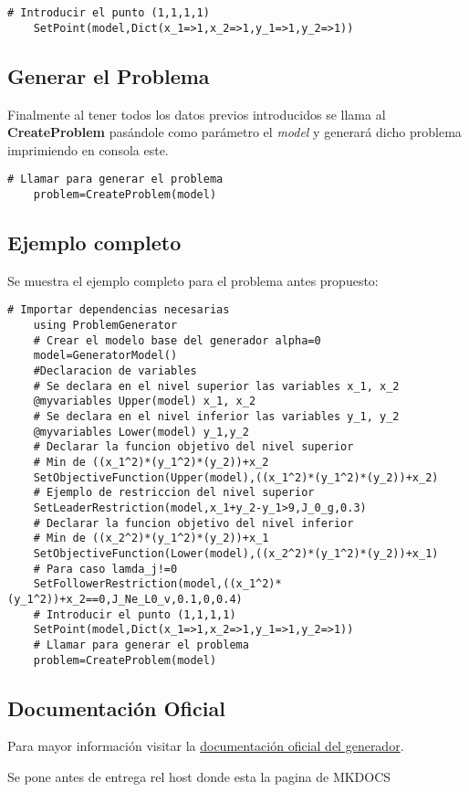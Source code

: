 \begin{lstlisting}[caption={Introducir el punto $(1,1,1,1)$}]
    # Introducir el punto (1,1,1,1)
    SetPoint(model,Dict(x_1=>1,x_2=>1,y_1=>1,y_2=>1))
\end{lstlisting}

\subsection{Generar el Problema}
Finalmente al tener todos los datos previos introducidos se llama al \textbf{CreateProblem} pasándole como parámetro el \textit{model} 
y generará dicho problema imprimiendo en consola este.

\begin{lstlisting}[caption={Generar el problema}]
    # Llamar para generar el problema
    problem=CreateProblem(model)
\end{lstlisting}
\begin{samepage}
    
\subsection{Ejemplo completo}
Se muestra el ejemplo completo para el problema antes propuesto:
\begin{lstlisting}[caption={Script}]
    # Importar dependencias necesarias
    using ProblemGenerator
    # Crear el modelo base del generador alpha=0
    model=GeneratorModel()
    #Declaracion de variables
    # Se declara en el nivel superior las variables x_1, x_2
    @myvariables Upper(model) x_1, x_2
    # Se declara en el nivel inferior las variables y_1, y_2
    @myvariables Lower(model) y_1,y_2
    # Declarar la funcion objetivo del nivel superior
    # Min de ((x_1^2)*(y_1^2)*(y_2))+x_2
    SetObjectiveFunction(Upper(model),((x_1^2)*(y_1^2)*(y_2))+x_2)
    # Ejemplo de restriccion del nivel superior
    SetLeaderRestriction(model,x_1+y_2-y_1>9,J_0_g,0.3)
    # Declarar la funcion objetivo del nivel inferior
    # Min de ((x_2^2)*(y_1^2)*(y_2))+x_1
    SetObjectiveFunction(Lower(model),((x_2^2)*(y_1^2)*(y_2))+x_1)
    # Para caso lamda_j!=0
    SetFollowerRestriction(model,((x_1^2)*(y_1^2))+x_2==0,J_Ne_L0_v,0.1,0,0.4)
    # Introducir el punto (1,1,1,1)
    SetPoint(model,Dict(x_1=>1,x_2=>1,y_1=>1,y_2=>1))
    # Llamar para generar el problema
    problem=CreateProblem(model)
\end{lstlisting}

\end{samepage}
\subsection{Documentación Oficial}
Para mayor información visitar la \href{https://github.com/FVSB/Tesis}{documentación oficial del generador}. 

Se pone antes de entrega rel host donde esta la pagina de MKDOCS
